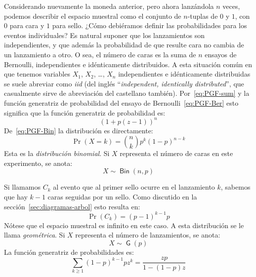   Considerando nuevamente la moneda anterior,
  pero ahora lanzándola \(n\) veces,
  podemos describir el espacio muestral
  como el conjunto de \(n\)\nobreakdash-tuplas de \(0\) y \(1\),
  con \(0\) para cara y \(1\) para sello.
  ¿Cómo debiéramos definir las probabilidades
  para los eventos individuales?
  Es natural suponer que los lanzamientos son independientes,
  y que además la probabilidad de que resulte cara
  no cambia de un lanzamiento a otro.
  O sea,
  el número de caras es la suma de \(n\) ensayos de Bernoulli,
  independientes e idénticamente distribuidos.
  A esta situación común
  en que tenemos variables \(X_1\), \(X_2\), \ldots, \(X_n\)
  independientes e idénticamente distribuidas
  se suele abreviar como \emph{iid}
  (del inglés
   ``\emph{\foreignlanguage{english}{independent, identically distributed}}'',
   que casualmente sirve de abreviación del castellano también).%
  Por~\eqref{eq:PGF-sum}
  y la función generatriz de probabilidad
  del ensayo de Bernoulli~\eqref{eq:PGF-Ber}
  esto significa que la función generatriz de probabilidad es:
  \begin{equation}
    \label{eq:PGF-Bin}
    (1 + p (z - 1))^n
  \end{equation}
  De~\eqref{eq:PGF-Bin}
  la distribución es directamente:
  \begin{equation}
    \label{eq:binomial-distribution}
    \Pr(X = k)
      = \binom{n}{k} p^k (1 - p)^{n - k}
  \end{equation}
  Esta es la \emph{distribución binomial}.%
  Si \(X\) representa el número de caras en este experimento,
  se anota:
  \begin{equation}
    \label{eq:distributed-Bin}
    X \sim \operatorname{\boldsymbol{\mathsf{Bin}}}(n, p)
  \end{equation}

  Si llamamos \(C_k\) al evento que al primer sello
  ocurre en el lanzamiento \(k\),
  sabemos que hay \(k - 1\) caras seguidas por un sello.
  Como discutido en la sección~\ref{sec:diagramas-arbol}
  esto resulta en:
  \begin{equation*}
    \Pr(C_k)
      = (p - 1)^{k - 1} p
  \end{equation*}
  Nótese que el espacio muestral es infinito en este caso.
  A esta distribución se le llama \emph{geométrica}.%
  Si \(X\) representa el número de lanzamientos,
  se anota:
  \begin{equation}
    \label{eq:distributed-G}
    X \sim \operatorname{\boldsymbol{\mathsf{G}}}(p)
  \end{equation}
  La función generatriz de probabilidades es:
  \begin{equation}
    \label{eq:PGF-G}
    \sum_{k \ge 1} (1 - p)^{k - 1} p z^k
      = \frac{z p}{1 - (1 - p) z}
  \end{equation}

